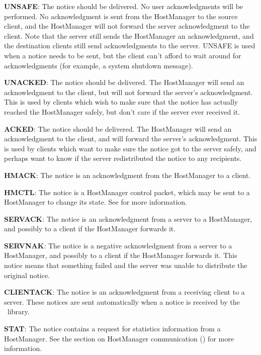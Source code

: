 \begin{description}
\item {\bf UNSAFE}: The notice should be delivered.
No user acknowledgments will be performed.  No
acknowledgment is sent from the HostManager to the source client, and
the HostManager will not forward the server acknowledgment to the
client.  Note that the server still sends the HostManager an
acknowledgment, and the destination clients still send acknowledgments
to the server.  UNSAFE is used when a notice needs to be sent, but the
client can't afford to wait around for acknowledgments (for example, a
system shutdown message).

\item {\bf UNACKED}: The notice should be
delivered.  The HostManager will send an acknowledgment to the
client, but will not forward the server's acknowledgment.  This is
used by clients which wish to make sure that the notice has actually
reached the HostManager safely, but don't care if the
server ever received it.

\item {\bf ACKED}: The notice should be delivered.  The HostManager
will send an acknowledgment to the client, and will forward the
server's acknowledgment.  This is used by clients which want to make
sure the notice got to the server safely, and perhaps want to know if
the server redistributed the notice to any recipients.

\item {\bf HMACK}: The notice is an acknowledgment from the HostManager to
a client.

\item {\bf HMCTL}: The notice is a HostManager control packet, which
may be sent to a HostManager to change its state.  See 
 for more
information.

\item {\bf SERVACK}: The notice is an acknowledgment from a server to
a HostManager, and possibly to a client if the HostManager forwards
it.

\item {\bf SERVNAK}: The notice is a negative acknowledgment from a
server to a HostManager, and possibly to a client if the HostManager
forwards it.  This notice means that something failed and the server
was unable to distribute the original notice.

\item {\bf CLIENTACK}: The notice is an acknowledgment from a
receiving client to a server.  These notices are sent automatically
when a notice is received by the \Zephyr\ library.

\item {\bf STAT}: The notice contains a request for statistics
information from a HostManager.  See the section on
HostManager communication () for more information.
\end{description}

